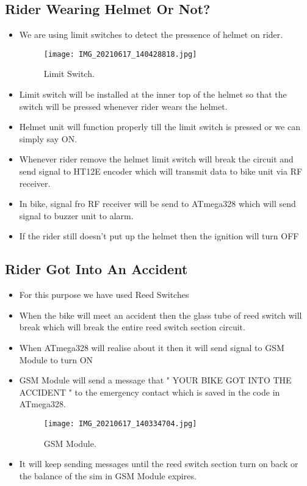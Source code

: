 \subsection{Rider Wearing Helmet Or Not?}
\begin{itemize}
	\item We are using limit switches to detect the pressence of helmet on rider.
	\begin{figure}[h]
		\centering
		\texttt{[image: IMG\_20210617\_140428818.jpg]}
		\caption{Limit Switch.}
	\end{figure}
	\item Limit switch will be installed at the inner top of the helmet so that the switch will be pressed whenever rider wears the helmet.
	\item Helmet unit will function properly till the limit switch is pressed or we can simply say ON.
	\item Whenever rider remove the helmet limit switch will break the circuit and send signal to HT12E encoder which will transmit data to bike unit via RF receiver.
	\item In bike, signal fro RF receiver will be send to ATmega328 which will send signal to buzzer unit to alarm.
	\item If the rider still doesn't put up the helmet then the ignition will turn OFF
\end{itemize}
\subsection{Rider Got Into An Accident}
\begin{itemize}
	\item For this purpose we have used Reed Switches
	\item When the bike will meet an accident then the glass tube of reed switch will break which will break the entire reed switch section circuit.
	\item When ATmega328 will realise about it then it will send signal to GSM Module to turn ON
	\item GSM Module will send a message that " YOUR BIKE GOT INTO THE ACCIDENT " to the emergency contact which is saved in the code in ATmega328.
	\begin{figure}[h]
		\centering
		\texttt{[image: IMG\_20210617\_140334704.jpg]}
		\caption{GSM Module.}
	\end{figure}
	\item It will keep sending messages until the reed switch section turn on back or the balance of the sim in GSM Module expires.   
\end{itemize}
